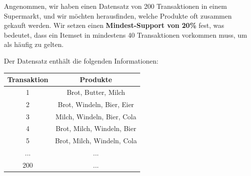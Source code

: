 \begin{myexample}
    Angenommen, wir haben einen Datensatz von 200 Transaktionen in einem Supermarkt, und wir möchten herausfinden, welche Produkte oft zusammen gekauft werden. Wir setzen einen \textbf{Mindest-Support von 20\%} fest, was bedeutet, dass ein Itemset in mindestens 40 Transaktionen vorkommen muss, um als häufig zu gelten.

    Der Datensatz enthält die folgenden Informationen:
    \begin{table}[H]
        \centering
        \begin{tabular}{cc}
            \textbf{Transaktion} & \textbf{Produkte}          \\
            \midrule
            1                    & Brot, Butter, Milch        \\
            2                    & Brot, Windeln, Bier, Eier  \\
            3                    & Milch, Windeln, Bier, Cola \\
            4                    & Brot, Milch, Windeln, Bier \\
            5                    & Brot, Milch, Windeln, Cola \\
            ...                  & ...                        \\
            200                  & ...                        \\
        \end{tabular}


\end{table}
\end{myexample}
